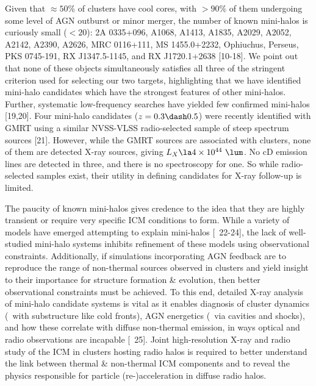 \documentclass[letterpaper,11pt]{article}
\begin{document}
Given that $\approx50\%$ of clusters have cool cores, with $> 90\%$ of
them undergoing some level of AGN outburst or minor merger, the number
of known mini-halos is curiously small ($< 20$): 2A 0335+096, A1068, A1413,
A1835, A2029, A2052, A2142, A2390, A2626, MRC 0116+111, MS
1455.0+2232, Ophiuchus, Perseus, PKS 0745-191, RX J1347.5-1145, and RX
J1720.1+2638 [10-18]. We point out that none of these objects
simultaneously satisfies all three of the stringent criterion used for
selecting our two targets, highlighting that we have identified mini-halo
candidates which have the strongest features of other mini-halos. Further,
systematic low-frequency searches have yielded few confirmed mini-halos
[19,20]. Four mini-halo candidates ($z=0.3 \dash 0.5$) were recently
identified with GMRT using a similar NVSS-VLSS radio-selected sample
of steep spectrum sources [21]. However, while the GMRT sources are
associated with clusters, none of them are detected X-ray sources,
giving $L_X \la 4 \times 10^{44} ~\lum$. No cD emission lines are
detected in three, and there is no spectroscopy for one. So while
radio-selected samples exist, their utility in defining candidates for
X-ray follow-up is limited.

The paucity of known mini-halos gives credence to the idea that they are
highly transient or require very specific ICM conditions to
form. While a variety of models have emerged attempting to explain mini-halos
[\eg\ 22-24], the lack of well-studied mini-halo systems inhibits refinement
of these models using observational constraints. Additionally, if
simulations incorporating AGN feedback are to reproduce the range of
non-thermal sources observed in clusters and yield insight to their
importance for structure formation \& evolution, then better
observational constraints must be achieved. To this end, detailed
X-ray analysis of mini-halo candidate systems is vital as it enables
diagnosis of cluster dynamics (\eg\ with substructure like cold
fronts), AGN energetics (\eg\ via cavities and shocks), and how these
correlate with diffuse non-thermal emission, in ways optical and radio
observations are incapable [\eg\ 25]. Joint high-resolution X-ray and
radio study of the ICM in clusters hosting radio halos is required to
better understand the link between thermal \& non-thermal ICM
components and to reveal the physics responsible for particle
(re-)acceleration in diffuse radio halos.
\end{document}
